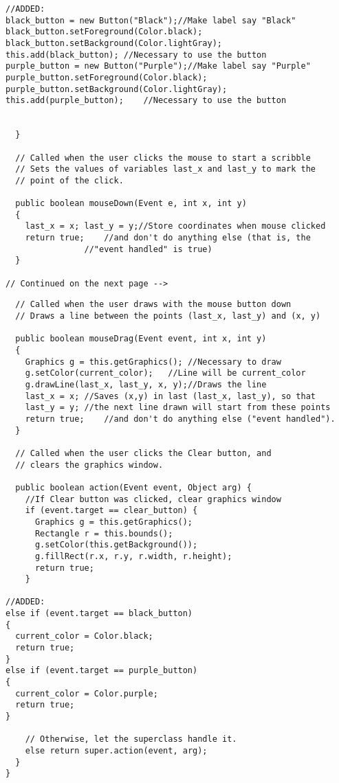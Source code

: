 \begin{enumerate}
\begin{enumerate}
\begin{verbatim}
//ADDED:
black_button = new Button("Black");//Make label say "Black"
black_button.setForeground(Color.black);
black_button.setBackground(Color.lightGray);
this.add(black_button);	//Necessary to use the button
purple_button = new Button("Purple");//Make label say "Purple"
purple_button.setForeground(Color.black);
purple_button.setBackground(Color.lightGray);
this.add(purple_button);	//Necessary to use the button
    
       
  }
    
  // Called when the user clicks the mouse to start a scribble
  // Sets the values of variables last_x and last_y to mark the
  // point of the click.
    
  public boolean mouseDown(Event e, int x, int y)
  {
    last_x = x; last_y = y;//Store coordinates when mouse clicked
    return true;	//and don't do anything else (that is, the
        		//"event handled" is true)
  }
    
// Continued on the next page -->
\end{verbatim}

\begin{verbatim}
  // Called when the user draws with the mouse button down
  // Draws a line between the points (last_x, last_y) and (x, y)
    
  public boolean mouseDrag(Event event, int x, int y)
  {
    Graphics g = this.getGraphics(); //Necessary to draw 
    g.setColor(current_color);	 //Line will be current_color
    g.drawLine(last_x, last_y, x, y);//Draws the line
    last_x = x;	//Saves (x,y) in last (last_x, last_y), so that
    last_y = y;	//the next line drawn will start from these points
    return true;	//and don't do anything else ("event handled").
  }

  // Called when the user clicks the Clear button, and 
  // clears the graphics window.
    
  public boolean action(Event event, Object arg) {
    //If Clear button was clicked, clear graphics window
    if (event.target == clear_button) {
      Graphics g = this.getGraphics();
      Rectangle r = this.bounds();
      g.setColor(this.getBackground());
      g.fillRect(r.x, r.y, r.width, r.height);
      return true;
    }
    
//ADDED:
else if (event.target == black_button)
{
  current_color = Color.black;
  return true;
}
else if (event.target == purple_button)
{
  current_color = Color.purple;
  return true;
}
    
    // Otherwise, let the superclass handle it.
    else return super.action(event, arg);
  }
}
\end{verbatim}


\end{enumerate}
\end{enumerate}
